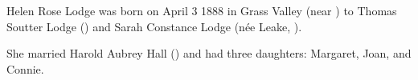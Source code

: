 
Helen Rose Lodge was born on April 3 1888 in Grass Valley (near )\cite{FamilyNotices} to Thomas Soutter Lodge () and Sarah Constance Lodge (n\'{e}e Leake, ).\cite{BMD}

She married Harold Aubrey Hall () and had three daughters: Margaret, Joan, and Connie.
